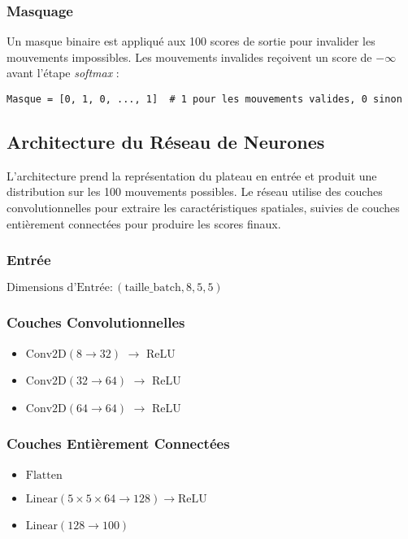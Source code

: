 \documentclass[]{article}
\begin{document}
\subsubsection{Masquage}
Un masque binaire est appliqué aux 100 scores de sortie pour invalider les mouvements impossibles. Les mouvements invalides reçoivent un score de \(-\infty\) avant l'étape \textit{softmax} :
\begin{verbatim}
Masque = [0, 1, 0, ..., 1]  # 1 pour les mouvements valides, 0 sinon
\end{verbatim}

\subsection{Architecture du Réseau de Neurones}
L'architecture prend la représentation du plateau en entrée et produit une distribution sur les 100 mouvements possibles. Le réseau utilise des couches convolutionnelles pour extraire les caractéristiques spatiales, suivies de couches entièrement connectées pour produire les scores finaux.

\subsubsection{Entrée}
\(\text{Dimensions d'Entrée}: (\text{taille\_batch}, 8, 5, 5)\)

\subsubsection{Couches Convolutionnelles}
\begin{itemize}
    \item \(\text{Conv2D}(8 \rightarrow 32)\) \(\rightarrow\) ReLU
    \item \(\text{Conv2D}(32 \rightarrow 64)\) \(\rightarrow\) ReLU
    \item \(\text{Conv2D}(64 \rightarrow 64)\) \(\rightarrow\) ReLU
\end{itemize}

\subsubsection{Couches Entièrement Connectées}
\begin{itemize}
    \item \(\text{Flatten}\)
    \item \(\text{Linear}(5 \times 5 \times 64 \rightarrow 128) \rightarrow \text{ReLU}\)
    \item \(\text{Linear}(128 \rightarrow 100)\)
\end{itemize}
\end{document}
